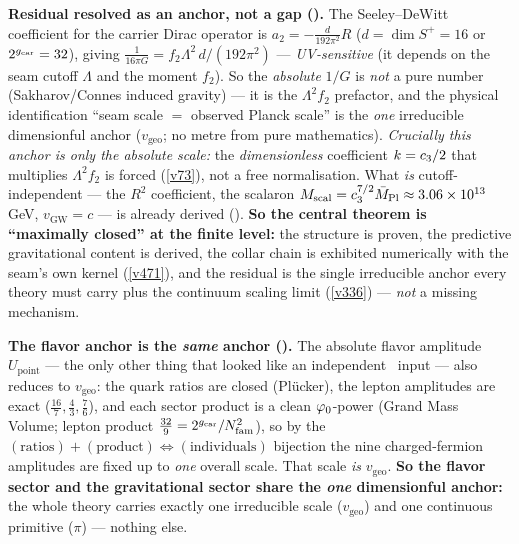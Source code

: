 \begin{gapbox}
\smallskip\noindent\textbf{Residual resolved as an anchor, not a gap ().}
The Seeley--DeWitt coefficient for the carrier Dirac operator is $a_2=-\tfrac{d}{192\pi^2}R$ ($d=\dim S^+=16$
or $2^{g_{\mathrm{car}}}=32$), giving $\tfrac1{16\pi G}=f_2\Lambda^2\,d/(192\pi^2)$ --- \emph{UV-sensitive} (it depends on
the seam cutoff $\Lambda$ and the moment $f_2$). So the \emph{absolute} $1/G$ is \emph{not} a pure number
(Sakharov/Connes induced gravity) --- it is the $\Lambda^2 f_2$ prefactor, and the physical identification
``seam scale $=$ observed Planck scale'' is the \emph{one} irreducible dimensionful anchor
($v_{\mathrm{geo}}$; no metre from pure mathematics). \emph{Crucially this anchor is only the absolute scale:}
the \emph{dimensionless} coefficient $k=c_3/2$ that multiplies $\Lambda^2 f_2$ is forced (\vref{v73}), not a free
normalisation. What \emph{is} cutoff-independent --- the $R^2$
coefficient, the scalaron $M_{\mathrm{scal}}=c_3^{7/2}\bar M_{\mathrm{Pl}}\approx3.06\times10^{13}$ GeV,
$v_{\mathrm{GW}}=c$ --- is already derived (). \textbf{So the central theorem
is ``maximally closed'' at the finite level:} the structure is proven, the predictive gravitational content is
derived, the collar chain is exhibited numerically with the seam's own kernel (\vref{v471}), and the residual
is the single irreducible anchor every theory must carry plus the continuum scaling limit (\vref{v336}) ---
\emph{not} a missing mechanism.

\smallskip\noindent\textbf{The flavor anchor is the \emph{same} anchor ().} The
absolute flavor amplitude $U_{\mathrm{point}}$ --- the only other thing that looked like an independent
\mO\ input --- also reduces to $v_{\mathrm{geo}}$: the quark ratios are closed (Pl\"ucker), the lepton
amplitudes are exact ($\tfrac{16}7,\tfrac43,\tfrac76$), and each sector product is a clean $\varphi_0$-power
(Grand Mass Volume; lepton product $\tfrac{32}9=2^{g_{\mathrm{car}}}/N_{\mathrm{fam}}^2$), so by the
$(\text{ratios})+(\text{product})\Leftrightarrow(\text{individuals})$ bijection the nine charged-fermion
amplitudes are fixed up to \emph{one} overall scale. That scale \emph{is} $v_{\mathrm{geo}}$. \textbf{So the
flavor sector and the gravitational sector share the \emph{one} dimensionful anchor:} the whole theory carries
exactly one irreducible scale ($v_{\mathrm{geo}}$) and one continuous primitive ($\pi$) --- nothing else.


\end{gapbox}
